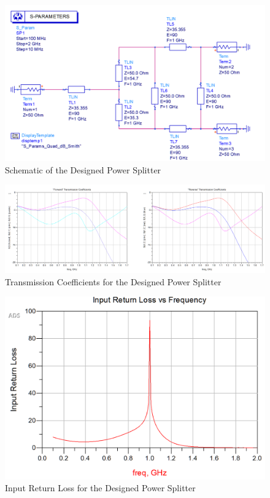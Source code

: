 \begin{figure}[H]
    \centering
    \includegraphics[width=0.8\linewidth]{img/Problem3/PowerSplitterSchematic.PNG}
    \caption{Schematic of the Designed Power Splitter}
    \label{fig:img/Problem3/PowerSplitterSchematic.PNG}
\end{figure}

\begin{figure}[H]
    \centering
    \includegraphics[width=0.8\linewidth]{img/Problem3/PowerSplitterTransmissionCoefficients.PNG}
    \caption{Transmission Coefficients for the Designed Power Splitter}
    \label{fig:img/Problem3/PowerSplitterTransmissionCoefficients}
\end{figure}

\begin{figure}[H]
    \centering
    \includegraphics[width=0.8\linewidth]{img/Problem3/PowerSplitterInputReturnLoss.PNG}
    \caption{Input Return Loss for the Designed Power Splitter}
    \label{fig:img/Problem3/PowerSplitterInputReturnLoss.PNG}
\end{figure}
